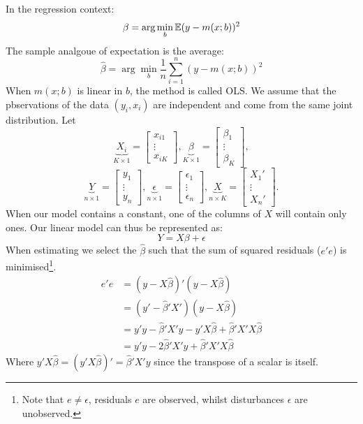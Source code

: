 \documentclass[DIV=14,titlepage=false]{scrreprt}
\begin{document}
In the regression context:
\[ \beta = \arg \min_{b} \mathbb{E} (y-m(x;b))^2\]
The sample analgoue of expectation is the average: 
\[ \hat{\beta} = \arg \min_{b} \frac{1}{n}\sum_{i=1}^{n}(y-m(x;b))^2\]
When $m(x;b)$ is linear in $b$, the method is called OLS. We assume that the pbservations of the data $(y_i,x_i)$ are independent and come from the same joint distribution. Let
$$
\underbrace{X_i}_{K \times 1} = \begin{bmatrix} x_{i1} \\ \vdots \\ x_{iK} \end{bmatrix},
\underbrace{\beta}_{K \times 1} = \begin{bmatrix} \beta_{1} \\ \vdots \\ \beta_{K} \end{bmatrix},
$$
$$
\underbrace{Y}_{n \times 1} = \begin{bmatrix} y_{1} \\ \vdots \\ y_{n} \end{bmatrix},
\underbrace{\epsilon}_{n \times 1} = \begin{bmatrix} \epsilon_{1} \\ \vdots \\ \epsilon_{n} \end{bmatrix},
\underbrace{X}_{n \times K} = \begin{bmatrix} X_{1}' \\ \vdots \\ X_{n}' \end{bmatrix}.
$$
When our model contains a constant, one of the columns of $X$ will contain only ones. Our linear model can thus be represented as: 
\[ Y=X\beta +\epsilon \]
When estimating we select the $\hat\beta$ such that the sum of squared residuals ($e'e$) is minimised\footnote[1]{Note that $e \not = \epsilon$, residuals $e$ are observed, whilst disturbances $\epsilon$ are unobserved.}.
\begin{align*}
    e'e &= (y-X\hat\beta)'(y-X\hat\beta)\\
    &= (y'-\hat\beta'X')(y-X\hat\beta)\\
    &= y'y -\hat\beta'X'y-y'X\hat\beta + \hat\beta'X'X\hat\beta\\
    &= y'y - 2\hat\beta'X'y + \hat\beta'X'X\hat\beta
\end{align*}
Where $y'X\hat\beta = (y'X\hat\beta)'= \hat\beta'X'y$ since the transpose of a scalar is itself. 
\end{document}
